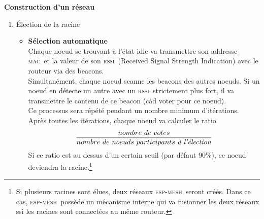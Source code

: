 \documentclass[a4paper, 12pt]{report}
\newcommand{\espmesh}{\textsc{esp-mesh}}
\newcommand{\mac}{\textsc{mac}}
\newcommand{\rssi}{\textsc{rssi}}
\begin{document}
        \textbf{Construction d'un réseau}
        \newline
        \begin{enumerate}
            \item \'Election de la racine
                \begin{itemize}
                    \item \textbf{Sélection automatique}\\
                        Chaque noeud se trouvant à l'état idle va transmettre son addresse \mac\ et
                        la valeur de son \rssi\ (Received Signal Strength Indication) avec le routeur via des beacons.\\
                        Simultanément, chaque noeud scanne les beacons des autres noeuds. Si un noeud
                        en détecte un autre avec un \rssi\ strictement plus fort, il va transmettre le contenu de
                        ce beacon (càd voter pour ce noeud).\\
                        Ce processus sera répété pendant un nombre minimum d'itérations.\\
                        Après toutes les itérations, chaque noeud va calculer le ratio
                        \[\frac{nombre\ de\ votes}{nombre\ de\ noeuds\ participants\ \textrm{\textit{à l'élection}}}\]
                        Si ce ratio est au dessus d'un certain seuil (par défaut 90\%), ce noeud deviendra la racine.\footnote{
                            Si plusieurs racines sont élues, deux réseaux \espmesh\ seront créés.
                            Dans ce cas, \espmesh\ possède un mécanisme interne qui va fusionner les deux réseaux
                            ssi les racines sont connectées au même routeur.
                        }




\end{itemize}
\end{enumerate}
\end{document}
